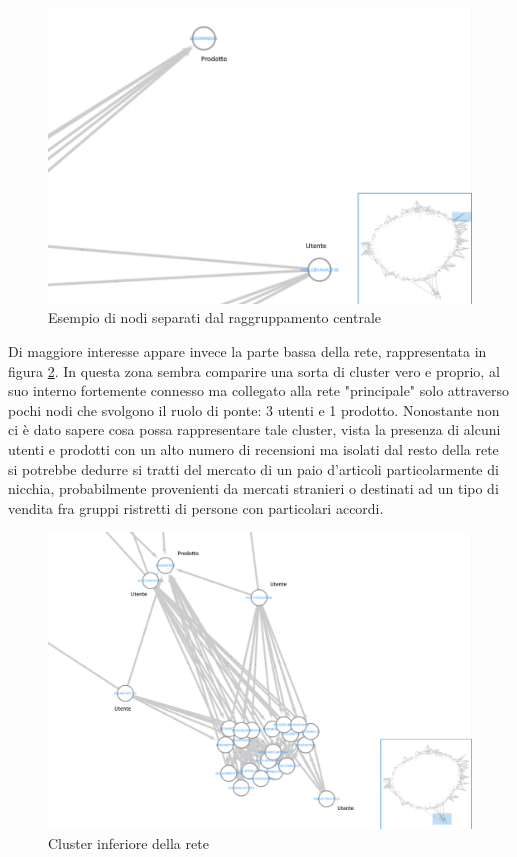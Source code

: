 \documentclass[hidelinks, 12pt]{article}
\begin{document}
\begin{figure}[H]
	\centering
	\includegraphics[scale=0.5]{images/03_02_cyto_net_2.png}
	\caption[Esempio di nodi separati dal raggruppamento centrale]{Esempio di nodi separati dal raggruppamento centrale}
	\label{fig:cyto-net-2}
\end{figure}

\vspace{5ex}

Di maggiore interesse appare invece la parte bassa della rete, rappresentata in figura \ref{fig:cyto-net-3}. In questa zona sembra comparire una sorta di cluster vero e proprio, al suo interno fortemente connesso ma collegato alla rete "principale" solo attraverso pochi nodi che svolgono il ruolo di ponte: 3 utenti e 1 prodotto. Nonostante non ci è dato sapere cosa possa rappresentare tale cluster, vista la presenza di alcuni utenti e prodotti con un alto numero di recensioni ma isolati dal resto della rete si potrebbe dedurre si tratti del mercato di un paio d'articoli particolarmente di nicchia, probabilmente provenienti da mercati stranieri o destinati ad un tipo di vendita fra gruppi ristretti di persone con particolari accordi.

\begin{figure}[H]
	\centering
	\includegraphics[scale=0.36]{images/03_03_cyto_net_3.png}
	\caption[Cluster inferiore della rete]{Cluster inferiore della rete}
	\label{fig:cyto-net-3}
\end{figure}
\end{document}
